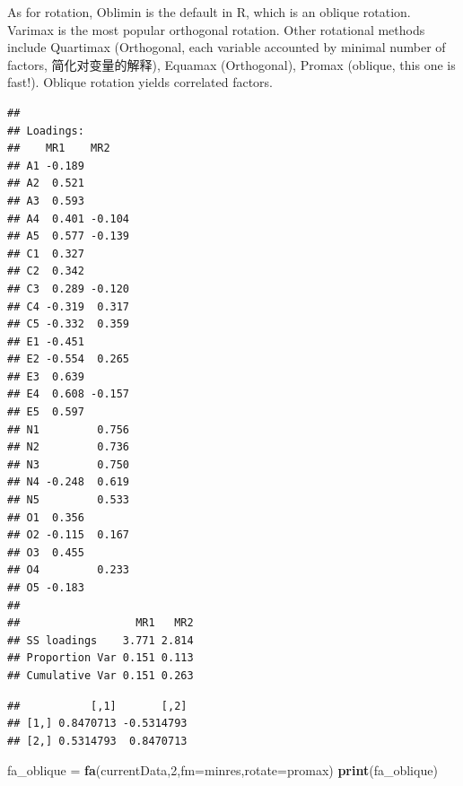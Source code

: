 \documentclass[
]{ctexart}
\newenvironment{Shaded}{\begin{snugshade}}{\end{snugshade}}
\newcommand{\AttributeTok}[1]{\textcolor[rgb]{0.13,0.29,0.53}{#1}}
\newcommand{\CommentTok}[1]{\textcolor[rgb]{0.56,0.35,0.01}{\textit{#1}}}
\newcommand{\DecValTok}[1]{\textcolor[rgb]{0.00,0.00,0.81}{#1}}
\newcommand{\FunctionTok}[1]{\textcolor[rgb]{0.13,0.29,0.53}{\textbf{#1}}}
\newcommand{\NormalTok}[1]{#1}
\newcommand{\OtherTok}[1]{\textcolor[rgb]{0.56,0.35,0.01}{#1}}
\newcommand{\SpecialCharTok}[1]{\textcolor[rgb]{0.81,0.36,0.00}{\textbf{#1}}}
\newcommand{\StringTok}[1]{\textcolor[rgb]{0.31,0.60,0.02}{#1}}
\begin{document}
As for rotation, Oblimin is the default in R, which is an oblique
rotation. Varimax is the most popular orthogonal rotation. Other
rotational methods include Quartimax (Orthogonal, each variable
accounted by minimal number of factors, 简化对变量的解释), Equamax
(Orthogonal), Promax (oblique, this one is fast!). Oblique rotation
yields correlated factors.

\begin{Shaded}
\end{Shaded}

\begin{verbatim}
## 
## Loadings:
##    MR1    MR2   
## A1 -0.189       
## A2  0.521       
## A3  0.593       
## A4  0.401 -0.104
## A5  0.577 -0.139
## C1  0.327       
## C2  0.342       
## C3  0.289 -0.120
## C4 -0.319  0.317
## C5 -0.332  0.359
## E1 -0.451       
## E2 -0.554  0.265
## E3  0.639       
## E4  0.608 -0.157
## E5  0.597       
## N1         0.756
## N2         0.736
## N3         0.750
## N4 -0.248  0.619
## N5         0.533
## O1  0.356       
## O2 -0.115  0.167
## O3  0.455       
## O4         0.233
## O5 -0.183       
## 
##                  MR1   MR2
## SS loadings    3.771 2.814
## Proportion Var 0.151 0.113
## Cumulative Var 0.151 0.263
\end{verbatim}

\begin{Shaded}
\end{Shaded}

\begin{verbatim}
##           [,1]       [,2]
## [1,] 0.8470713 -0.5314793
## [2,] 0.5314793  0.8470713
\end{verbatim}

\begin{Shaded}
\begin{Highlighting}[]
\NormalTok{fa\_oblique }\OtherTok{=} \FunctionTok{fa}\NormalTok{(currentData,}\DecValTok{2}\NormalTok{,}\AttributeTok{fm=}\StringTok{\textquotesingle{}minres\textquotesingle{}}\NormalTok{,}\AttributeTok{rotate=}\StringTok{\textquotesingle{}promax\textquotesingle{}}\NormalTok{)}
\FunctionTok{print}\NormalTok{(fa\_oblique)}
\end{Highlighting}
\end{Shaded}
\end{document}
